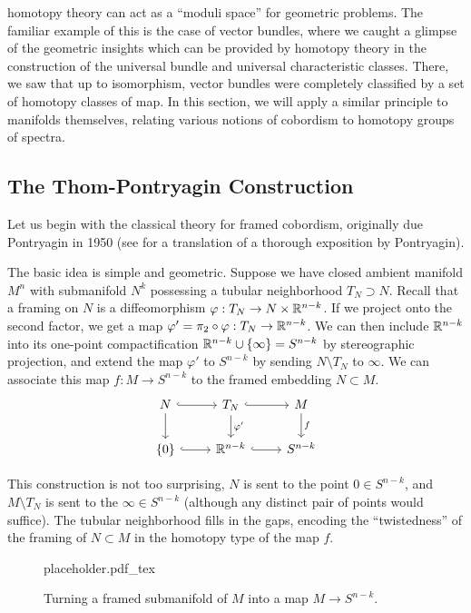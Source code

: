 homotopy theory can act as a ``moduli space'' for geometric problems. The familiar example of this is the case of vector bundles, where we caught a glimpse of the geometric insights which can be provided by homotopy theory in the construction of the universal bundle and universal characteristic classes. There, we saw that up to isomorphism, vector bundles were completely classified by a set of homotopy classes of map.
In this section, we will apply a similar principle to manifolds themselves, relating various notions of cobordism to homotopy groups of spectra.

\subsection{The Thom-Pontryagin Construction}

Let us begin with the classical theory for framed cobordism, originally due Pontryagin in 1950 (see \cite{pontryagin1959homotopy} for a translation of a thorough exposition by Pontryagin). 

The basic idea is simple and geometric. Suppose we have closed ambient manifold $M^n$ with submanifold $N^k$ possessing a tubular neighborhood $T_N\supset N$. Recall that a framing on $N$ is a diffeomorphism $\varphi : T_N \to N\times \mathbb{R}^{n-k}$. If we project onto the second factor, we get a map $\varphi'=\pi_2\circ \varphi : T_N \to \mathbb{R}^{n-k}$. We can then include $\mathbb{R}^{n-k}$ into its one-point compactification $\mathbb{R}^{n-k}\cup \{\infty\}=S^{n-k}$ by stereographic projection, and extend the map $\varphi'$ to $S^{n-k}$ by sending $N\setminus T_N$ to $\infty$. We can associate this map $f : M \to S^{n-k}$ to the framed embedding $N\subset M$.
\[\begin{tikzcd}
	N & {T_N} & M \\
	{\{0\}} & {\R^{n-k}} & {S^{n-k}}
	\arrow[hook, from=1-1, to=1-2]
	\arrow[from=1-1, to=2-1]
	\arrow[hook, from=1-2, to=1-3]
	\arrow["{\varphi'}", from=1-2, to=2-2]
	\arrow["f", from=1-3, to=2-3]
	\arrow[hook, from=2-1, to=2-2]
	\arrow[hook, from=2-2, to=2-3]
\end{tikzcd}\]

This construction is not too surprising, $N$ is sent to the point $0\in S^{n-k}$, and $M\setminus T_N$ is sent to the $\infty \in S^{n-k}$ (although any distinct pair of points would suffice). The tubular neighborhood fills in the gaps, encoding the ``twistedness'' of the framing of $N\subset M$ in the homotopy type of the map $f$.

\begin{figure}[ht]
	{placeholder.pdf_tex}
	\caption{Turning a framed submanifold of $M$ into a map $M\to S^{n-k}$.}
\end{figure}

